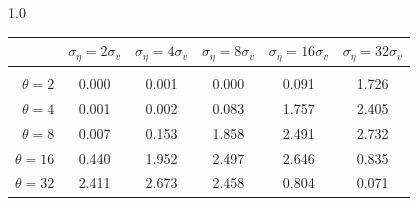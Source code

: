 \documentclass[12pt]{article}
\begin{document}
\begin{table}[h!]
\vspace{10pt}
\begin{subtable}{1.0\textwidth}
    \centering
\begin{tabular}{rccccc}
\hline  
            & \multicolumn{1}{l}{$\sigma_{\eta} =2\sigma_{v}$} & \multicolumn{1}{l}{$\sigma_{\eta} =4\sigma_{v}$} & \multicolumn{1}{l}{$\sigma_{\eta} =8\sigma_{v}$} & \multicolumn{1}{l}{$\sigma_{\eta} =16\sigma_{v}$} & \multicolumn{1}{l}{$\sigma_{\eta} =32\sigma_{v}$} \\ \hline  \vspace{-3mm} \\        
$\theta=2$  & 0.000                                             & 0.001                                             & 0.000                                             & 0.091                                              & 1.726                                              \\ \hline
$\theta=4$  & 0.001                                             & 0.002                                             & 0.083                                             & 1.757                                              & 2.405                                              \\ \hline
$\theta=8$  & 0.007                                             & 0.153                                             & 1.858                                             & 2.491                                              & 2.732                                              \\ \hline
$\theta=16$ & 0.440                                             & 1.952                                             & 2.497                                             & 2.646                                              & 0.835                                              \\ \hline
$\theta=32$ & 2.411                                             & 2.673                                             & 2.458                                             & 0.804                                              & 0.071                                              \\ \hline
\end{tabular}
\end{subtable}


\end{table}
\end{document}
